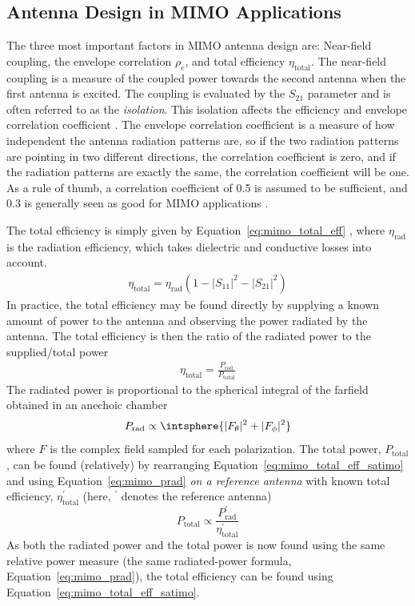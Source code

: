 \subsection{Antenna Design in MIMO Applications}
\label{sec:mimoant}
The three most important factors in MIMO antenna design are: Near-field coupling, the envelope correlation $\rho_e$, and total efficiency $\eta_{\text{total}}$. The near-field coupling is a measure of the coupled power towards the second antenna when the first antenna is excited. The coupling is evaluated by the $S_{21}$ parameter and is often referred to as the \emph{isolation}. This isolation affects the efficiency and envelope correlation coefficient \cite{Tatomirescu2011PortIsolation}. The envelope correlation coefficient is a measure of how independent the antenna radiation patterns are, so if the two radiation patterns are pointing in two different directions, the correlation coefficient is zero, and if the radiation patterns are exactly the same, the correlation coefficient will be one. As a rule of thumb, a correlation coefficient of \num{0.5} is assumed to be sufficient, and \num{0.3} is generally seen as good for MIMO applications \cite{Tim2012Practical}.

The total efficiency is simply given by Equation~\ref{eq:mimo_total_eff} \cite{Tatomirescu2011PortIsolation}, where $\eta_{\text{rad}}$ is the radiation efficiency, which takes dielectric and conductive losses into account.
\begin{align} 
\label{eq:mimo_total_eff}%
\eta_{\text{total}}=\eta_{\text{rad}} (1-|S_{11}|^2 - |S_{21}|^2)
\end{align}
In practice, the total efficiency may be found directly by supplying a known amount of power to the antenna and observing the power radiated by the antenna. The total efficiency is then the ratio of the radiated power to the supplied/total power \cite{balanis2012antenna}
\begin{align}
    \label{eq:mimo_total_eff_satimo}%
    \eta_{\text{total}} = \frac{P_{\text{rad}}}{P_{\text{total}}}
\end{align}
The radiated power is proportional to the spherical integral of the farfield obtained in an anechoic chamber \cite{balanis2012antenna}
\begin{equation}
    \label{eq:mimo_prad}%
    P_{\text{rad}} \propto \intsphere{|F_{\theta}|^2 + |F_{\phi}|^2}
\end{equation}
where $F$ is the complex field sampled for each polarization. The total power, $P_{\text{total}}$, can be found (relatively) by rearranging Equation~\ref{eq:mimo_total_eff_satimo} and using Equation~\ref{eq:mimo_prad} \emph{on a reference antenna} with known total efficiency, $\eta_{\text{total}}^{\prime}$ (here, $^{\prime}$ denotes the reference antenna)
\begin{equation}
    \label{eq:mimo_ptot}
    P_{\text{total}} \propto \frac{P_{\text{rad}}^{\prime}}{\eta_{\text{total}}^{\prime}}
\end{equation}
As both the radiated power and the total power is now found using the same relative power measure (the same radiated-power formula, Equation~\ref{eq:mimo_prad}), the total efficiency can be found using Equation~\ref{eq:mimo_total_eff_satimo}.

